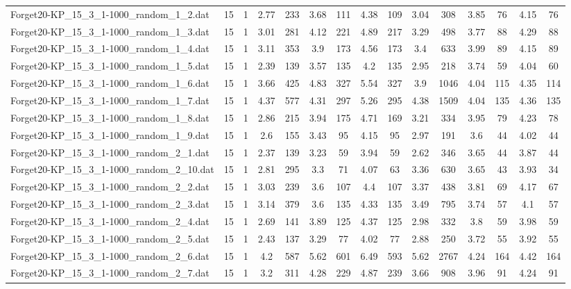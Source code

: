 \begin{table}[!ht]
{\begin{tabular}{lcccccccccccccc}
Forget20-KP\_15\_3\_1-1000\_random\_1\_2.dat & 15 & 1 & 2.77 & 233 & 3.68 & 111 & 4.38 & 109 & 3.04 & 308 & 3.85 & 76 & 4.15 & 76 \\
Forget20-KP\_15\_3\_1-1000\_random\_1\_3.dat & 15 & 1 & 3.01 & 281 & 4.12 & 221 & 4.89 & 217 & 3.29 & 498 & 3.77 & 88 & 4.29 & 88 \\
Forget20-KP\_15\_3\_1-1000\_random\_1\_4.dat & 15 & 1 & 3.11 & 353 & 3.9 & 173 & 4.56 & 173 & 3.4 & 633 & 3.99 & 89 & 4.15 & 89 \\
Forget20-KP\_15\_3\_1-1000\_random\_1\_5.dat & 15 & 1 & 2.39 & 139 & 3.57 & 135 & 4.2 & 135 & 2.95 & 218 & 3.74 & 59 & 4.04 & 60 \\
Forget20-KP\_15\_3\_1-1000\_random\_1\_6.dat & 15 & 1 & 3.66 & 425 & 4.83 & 327 & 5.54 & 327 & 3.9 & 1046 & 4.04 & 115 & 4.35 & 114 \\
Forget20-KP\_15\_3\_1-1000\_random\_1\_7.dat & 15 & 1 & 4.37 & 577 & 4.31 & 297 & 5.26 & 295 & 4.38 & 1509 & 4.04 & 135 & 4.36 & 135 \\
Forget20-KP\_15\_3\_1-1000\_random\_1\_8.dat & 15 & 1 & 2.86 & 215 & 3.94 & 175 & 4.71 & 169 & 3.21 & 334 & 3.95 & 79 & 4.23 & 78 \\
Forget20-KP\_15\_3\_1-1000\_random\_1\_9.dat & 15 & 1 & 2.6 & 155 & 3.43 & 95 & 4.15 & 95 & 2.97 & 191 & 3.6 & 44 & 4.02 & 44 \\
Forget20-KP\_15\_3\_1-1000\_random\_2\_1.dat & 15 & 1 & 2.37 & 139 & 3.23 & 59 & 3.94 & 59 & 2.62 & 346 & 3.65 & 44 & 3.87 & 44 \\
Forget20-KP\_15\_3\_1-1000\_random\_2\_10.dat & 15 & 1 & 2.81 & 295 & 3.3 & 71 & 4.07 & 63 & 3.36 & 630 & 3.65 & 43 & 3.93 & 34 \\
Forget20-KP\_15\_3\_1-1000\_random\_2\_2.dat & 15 & 1 & 3.03 & 239 & 3.6 & 107 & 4.4 & 107 & 3.37 & 438 & 3.81 & 69 & 4.17 & 67 \\
Forget20-KP\_15\_3\_1-1000\_random\_2\_3.dat & 15 & 1 & 3.14 & 379 & 3.6 & 135 & 4.33 & 135 & 3.49 & 795 & 3.74 & 57 & 4.1 & 57 \\
Forget20-KP\_15\_3\_1-1000\_random\_2\_4.dat & 15 & 1 & 2.69 & 141 & 3.89 & 125 & 4.37 & 125 & 2.98 & 332 & 3.8 & 59 & 3.98 & 59 \\
Forget20-KP\_15\_3\_1-1000\_random\_2\_5.dat & 15 & 1 & 2.43 & 137 & 3.29 & 77 & 4.02 & 77 & 2.88 & 250 & 3.72 & 55 & 3.92 & 55 \\
Forget20-KP\_15\_3\_1-1000\_random\_2\_6.dat & 15 & 1 & 4.2 & 587 & 5.62 & 601 & 6.49 & 593 & 5.62 & 2767 & 4.24 & 164 & 4.42 & 164 \\
Forget20-KP\_15\_3\_1-1000\_random\_2\_7.dat & 15 & 1 & 3.2 & 311 & 4.28 & 229 & 4.87 & 239 & 3.66 & 908 & 3.96 & 91 & 4.24 & 91 \\

\end{tabular}}
\end{table}
